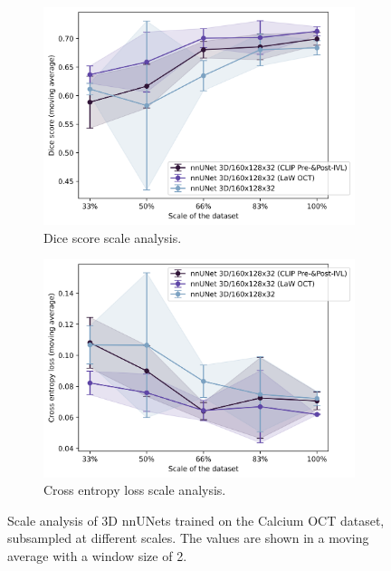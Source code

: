 \documentclass[a4paper,11pt,oneside]{report}
\begin{document}
\begin{figure}[hbt]
    \centering
    \begin{subfigure}[t]{0.49\textwidth}
        \includegraphics[width=1\linewidth]{figures/discussion_scale_analysis.png}
        \caption{Dice score scale analysis.}
        \label{fig:scale-analysis}
    \end{subfigure}%
    \begin{subfigure}[t]{0.49\textwidth}
        \includegraphics[width=1\linewidth]{figures/discussion_cross_entropy_scale_analysis.png}
        \caption{Cross entropy loss scale analysis.}
        \label{fig:cross-entropy-scale-analysis}
    \end{subfigure}
    \caption{Scale analysis of 3D nnUNets trained on the Calcium OCT dataset, subsampled at different scales. The values are shown in a moving average with a window size of 2.}
\end{figure}
\end{document}
